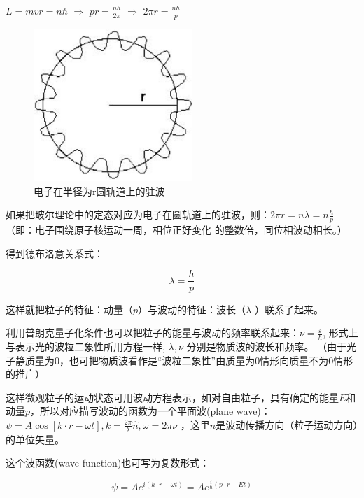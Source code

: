 $L = mvr = n\hbar $ $\Rightarrow$ $pr = \frac{{nh}}{{2\pi }}$
$\Rightarrow$ $2\pi r = \frac{{nh}}{p}$

\begin{figure}[h]
\begin{center}
\includegraphics[clip,width=6cm]{Duality/5-1.ps}
\caption{电子在半径为r圆轨道上的驻波}
\end{center}
\end{figure}


如果把玻尔理论中的定态对应为电子在圆轨道上的驻波，则：$2\pi r = n\lambda  = n\frac{h}{p}$
（即：电子围绕原子核运动一周，相位正好变化 的整数倍，同位相波动相长。）

得到德布洛意关系式：

\begin{equation}\label{5-1}
\lambda  = \frac{h}{p}
\end{equation}


这样就把粒子的特征：动量（$p$）与波动的特征：波长（$\lambda$ ）联系了起来。

利用普朗克量子化条件也可以把粒子的能量与波动的频率联系起来：$\nu  =
\frac{\varepsilon }{h}$, 形式上与表示光的波粒二象性所用方程一样,
$\lambda ,\nu $ 分别是物质波的波长和频率。
（由于光子静质量为$0$，也可把物质波看作是``波粒二象性''由质量为$0$情形向质量不为$0$情形的推广）

这样微观粒子的运动状态可用波动方程表示，如对自由粒子，具有确定的能量$E$和动量$p$，所以对应描写波动的函数为一个平面波(plane
wave)： $\psi  = A\cos \left[ {k \cdot r - \omega t} \right],k =
\frac{{2\pi }}{\lambda }\hat n,\omega  = 2\pi \nu $ ，这里$\hat
n$是波动传播方向（粒子运动方向）的单位矢量。

这个波函数(wave function)也可写为复数形式：

\begin{equation}
\psi  = Ae^{i(k \cdot r - \omega t)} = Ae^{\frac{i}{\hbar }(p \cdot
r - Et)}
\end{equation}

